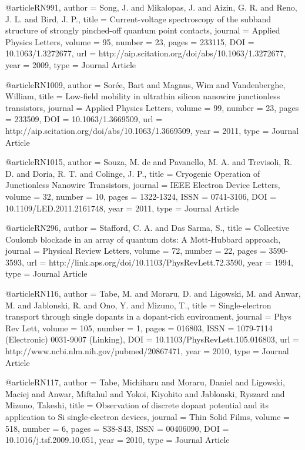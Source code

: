 @article{RN991,
   author = {Song, J. and Mikalopas, J. and Aizin, G. R. and Reno, J. L. and Bird, J. P.},
   title = {Current-voltage spectroscopy of the subband structure of strongly pinched-off quantum point contacts},
   journal = {Applied Physics Letters},
   volume = {95},
   number = {23},
   pages = {233115},
   DOI = {10.1063/1.3272677},
   url = {http://aip.scitation.org/doi/abs/10.1063/1.3272677},
   year = {2009},
   type = {Journal Article}
}

@article{RN1009,
   author = {Sorée, Bart and Magnus, Wim and Vandenberghe, William},
   title = {Low-field mobility in ultrathin silicon nanowire junctionless transistors},
   journal = {Applied Physics Letters},
   volume = {99},
   number = {23},
   pages = {233509},
   DOI = {10.1063/1.3669509},
   url = {http://aip.scitation.org/doi/abs/10.1063/1.3669509},
   year = {2011},
   type = {Journal Article}
}

@article{RN1015,
   author = {Souza, M. de and Pavanello, M. A. and Trevisoli, R. D. and Doria, R. T. and Colinge, J. P.},
   title = {Cryogenic Operation of Junctionless Nanowire Transistors},
   journal = {IEEE Electron Device Letters},
   volume = {32},
   number = {10},
   pages = {1322-1324},
   ISSN = {0741-3106},
   DOI = {10.1109/LED.2011.2161748},
   year = {2011},
   type = {Journal Article}
}

@article{RN296,
   author = {Stafford, C. A. and Das Sarma, S.},
   title = {Collective Coulomb blockade in an array of quantum dots: A Mott-Hubbard approach},
   journal = {Physical Review Letters},
   volume = {72},
   number = {22},
   pages = {3590-3593},
   url = {http://link.aps.org/doi/10.1103/PhysRevLett.72.3590},
   year = {1994},
   type = {Journal Article}
}

@article{RN116,
   author = {Tabe, M. and Moraru, D. and Ligowski, M. and Anwar, M. and Jablonski, R. and Ono, Y. and Mizuno, T.},
   title = {Single-electron transport through single dopants in a dopant-rich environment},
   journal = {Phys Rev Lett},
   volume = {105},
   number = {1},
   pages = {016803},
   ISSN = {1079-7114 (Electronic)
0031-9007 (Linking)},
   DOI = {10.1103/PhysRevLett.105.016803},
   url = {http://www.ncbi.nlm.nih.gov/pubmed/20867471},
   year = {2010},
   type = {Journal Article}
}

@article{RN117,
   author = {Tabe, Michiharu and Moraru, Daniel and Ligowski, Maciej and Anwar, Miftahul and Yokoi, Kiyohito and Jablonski, Ryszard and Mizuno, Takeshi},
   title = {Observation of discrete dopant potential and its application to Si single-electron devices},
   journal = {Thin Solid Films},
   volume = {518},
   number = {6},
   pages = {S38-S43},
   ISSN = {00406090},
   DOI = {10.1016/j.tsf.2009.10.051},
   year = {2010},
   type = {Journal Article}
}

